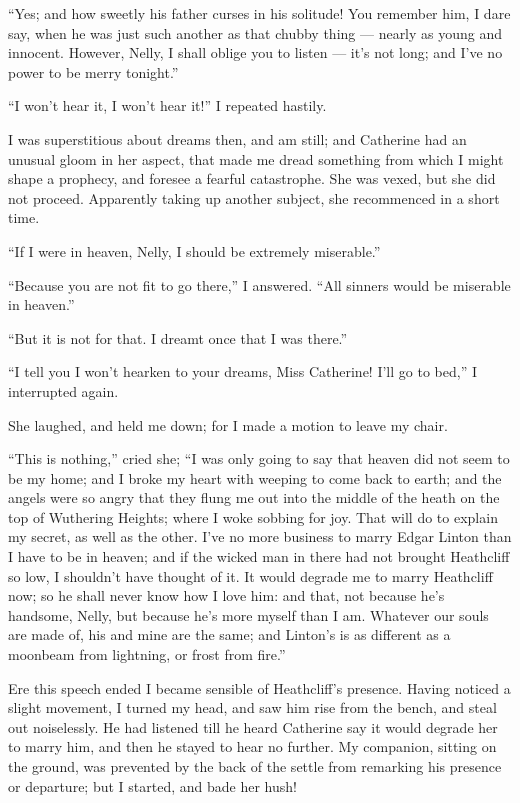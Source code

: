 \par “Yes; and how sweetly his father curses in his solitude! You remember him, I dare say, when he was just such another as that chubby thing — nearly as young and innocent. However, Nelly, I shall oblige you to listen — it's not long; and I've no power to be merry tonight.”
\par “I won't hear it, I won't hear it!” I repeated hastily.
\par I was superstitious about dreams then, and am still; and Catherine had an unusual gloom in her aspect, that made me dread something from which I might shape a prophecy, and foresee a fearful catastrophe. She was vexed, but she did not proceed. Apparently taking up another subject, she recommenced in a short time.
\par “If I were in heaven, Nelly, I should be extremely miserable.”
\par “Because you are not fit to go there,” I answered. “All sinners would be miserable in heaven.”
\par “But it is not for that. I dreamt once that I was there.”
\par “I tell you I won't hearken to your dreams, Miss Catherine! I'll go to bed,” I interrupted again.
\par She laughed, and held me down; for I made a motion to leave my chair.
\par “This is nothing,” cried she; “I was only going to say that heaven did not seem to be my home; and I broke my heart with weeping to come back to earth; and the angels were so angry that they flung me out into the middle of the heath on the top of Wuthering Heights; where I woke sobbing for joy. That will do to explain my secret, as well as the other. I've no more business to marry Edgar Linton than I have to be in heaven; and if the wicked man in there had not brought Heathcliff so low, I shouldn't have thought of it. It would degrade me to marry Heathcliff now; so he shall never know how I love him: and that, not because he's handsome, Nelly, but because he's more myself than I am. Whatever our souls are made of, his and mine are the same; and Linton's is as different as a moonbeam from lightning, or frost from fire.”
\par Ere this speech ended I became sensible of Heathcliff's presence. Having noticed a slight movement, I turned my head, and saw him rise from the bench, and steal out noiselessly. He had listened till he heard Catherine say it would degrade her to marry him, and then he stayed to hear no further. My companion, sitting on the ground, was prevented by the back of the settle from remarking his presence or departure; but I started, and bade her hush!
